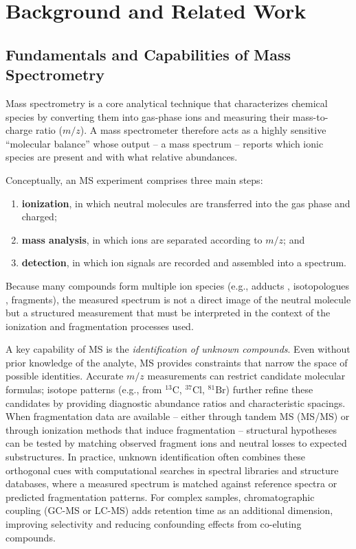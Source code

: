 \chapter{Background and Related Work}
\label{ch:2}
\noindent
\section{Fundamentals and Capabilities of Mass Spectrometry}
Mass spectrometry is a core analytical technique that characterizes chemical species by converting them into gas-phase ions and measuring their mass-to-charge ratio ($m/z$). \cite[p.~5]{Hoffmann2011}
A mass spectrometer therefore acts as a highly sensitive ``molecular balance'' whose output  -- a mass spectrum -- reports which ionic species are present and with what relative abundances. 

Conceptually, an MS experiment comprises three main steps:
\begin{enumerate}[label=(\roman*)]
    \item \textbf{ionization}, in which neutral molecules are transferred into the gas phase and charged; \cite[p.~1]{Hoffmann2011}
    \item \textbf{mass analysis}, in which ions are separated according to $m/z$; 
    and \item \textbf{detection}, in which ion signals are recorded and assembled into a spectrum. \cite[p.~5]{Hoffmann2011}    
\end{enumerate}
 
Because many compounds form multiple ion species (e.g., adducts \cite[p.~21]{Hoffmann2011}, isotopologues \cite[p.~67]{Gross2006}, fragments), the measured spectrum is not a direct image of the neutral molecule but a structured measurement that must be interpreted in the context of the ionization and fragmentation processes used. \cite[p.~16-18]{Hoffmann2011}

A key capability of MS is the \emph{identification of unknown compounds}. 
Even without prior knowledge of the analyte, MS provides constraints that narrow the space of possible identities. 
Accurate $m/z$ measurements can restrict candidate molecular formulas; 
isotope patterns (e.g., from $\mathrm{^{13}C}$, $\mathrm{^{37}Cl}$, $\mathrm{^{81}Br}$) further refine these candidates by providing diagnostic abundance ratios and characteristic spacings. \cite[p.~263]{Gross2006}
When fragmentation data are available -- either through tandem MS (MS/MS) or through ionization methods that induce fragmentation -- structural hypotheses can be tested by matching observed fragment ions and neutral losses to expected substructures. \cite[p.~225]{Gross2006}
In practice, unknown identification often combines these orthogonal cues with computational searches in spectral libraries and structure databases, 
where a measured spectrum is matched against reference spectra or predicted fragmentation patterns. \cite[p.~8]{Scheubert2013}
For complex samples, chromatographic coupling (GC-MS or LC-MS) adds retention time as an additional dimension, \cite[p.~475]{Gross2006} improving selectivity and reducing confounding effects from co-eluting compounds. \cite[p.~233-237]{Hoffmann2011}


